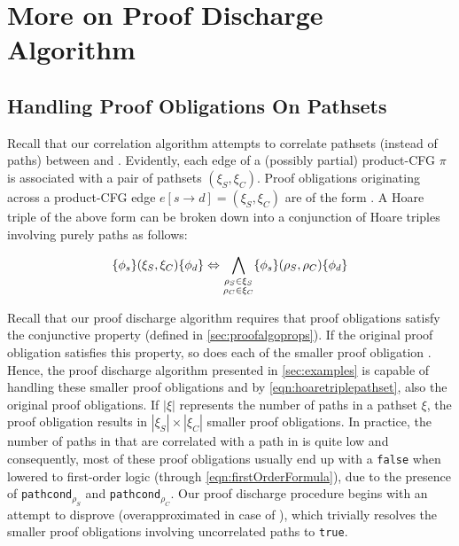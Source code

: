 \section{More on Proof Discharge Algorithm}
\label{sec:proofalgo}

\subsection{Handling Proof Obligations On Pathsets}
\label{sec:pathsethoaretriples}
Recall that our correlation algorithm attempts to correlate pathsets (instead of paths) between \sprog{} and \cprog{}.
Evidently, each edge of a (possibly partial) product-CFG $\pi$ is associated with a pair of pathsets $(\xi_S,\xi_C)$.
Proof obligations originating across a product-CFG edge $e[s \rightarrow d]=(\xi_S,\xi_C)$ are of
the form .
A Hoare triple of the above form can be broken down into a conjunction of Hoare triples involving purely paths as follows:

\begin{equation}
\label{eqn:hoaretriplepathset}
\{\phi_s\}(\xi_S,\xi_C)\{\phi_d\} \Leftrightarrow \bigwedge_{\substack{\rho_S \in \xi_S \\ \rho_C \in \xi_C}} \{\phi_s\}(\rho_S,\rho_C)\{\phi_d\}
\end{equation}

Recall that our proof discharge algorithm requires that proof obligations satisfy the conjunctive \recursiveRelation{} property (defined in \cref{sec:proofalgoprops}).
If the original proof obligation  satisfies this property, so does each of the smaller
proof obligation .
Hence, the proof discharge algorithm presented in \cref{sec:examples} is capable of handling these smaller proof obligations
and by \cref{eqn:hoaretriplepathset}, also the original proof obligations.
If $|\xi|$ represents the number of paths in a pathset $\xi$, the proof obligation  results
in $|\xi_S| \times |\xi_C|$ smaller proof obligations.
In practice, the number of paths in \sprog{} that are correlated with a path in \cprog{} is quite low
and consequently, most of these proof obligations usually end up with a {\tt false} \lhs{} when lowered to
first-order logic (through \cref{eqn:firstOrderFormula}), due to the presence of {\tt pathcond}$_{\rho_S}$ and {\tt pathcond}$_{\rho_C}$.
Our proof discharge procedure begins with an attempt to disprove \lhs{} (overapproximated in case of \recursiveRelations{}),
which trivially resolves the smaller proof obligations involving uncorrelated paths to {\tt true}.

